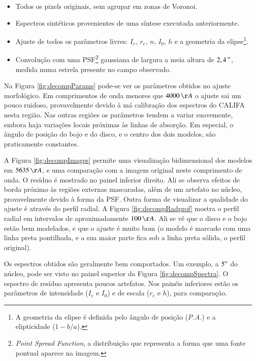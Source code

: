 \begin{itemize}

	\item Todos os pixels originais, sem agrupar em zonas de Voronoi.

	\item Espectros sintéticos provenientes de uma síntese executada anteriormente.

	\item Ajuste de todos os parâmetros livres: $I_e$, $r_e$, $n$, $I_0$, $h$ e a
	geometria da elipse\footnote{A geometria da elipse é definida pelo ângulo de
	posição ({\em P.A.}) e a elipticidade ($1 - b/a$).}.

	\item Convolução com uma PSF\footnote{{\em Point Spread Function}, a
	distribuição que representa a forma que uma fonte pontual aparece na imagem.}
	gaussiana de largura a meia altura de $2,4\,"$, medida numa estrela presente no
	campo observado.

\end{itemize}

Na Figura \ref{fig:decompParams} pode-se ver os parâmetros obtidos no ajuste
morfológico. Em comprimentos de onda menores que $4000\,\AA$ o ajuste sai um
pouco ruidoso, provavelmente devido à má calibração dos espectros do CALIFA
nesta região. Nas outras regiões os parâmetros tendem a variar suavemente,
embora haja variações locais próximas às linhas de absorção. Em especial, o
ângulo de posição do bojo e do disco, e o centro dos dois modelos, são
praticamente constantes.

A Figura \ref{fig:decompImages} permite uma visualização bidimensional dos
modelos em $5635\,\AA$, e uma comparação com a imagem original neste comprimento
de onda. O resíduo é mostrado no painel inferior direito. Ali se observa efeitos
de borda próximo às regiões externas mascaradas, além de um artefato no núcleo,
provavelmente devido à forma da PSF. Outra forma de visualizar a qualidade do
ajuste é através do perfil radial. A Figura \ref{fig:decompRadprof} mostra o
perfil radial em intervalos de aproximadamente $100\,\AA$. Ali se vê que o disco
e o bojo estão bem modelados, e que o ajuste é muito bom (o modelo é marcado com
uma linha preta pontilhada, e a sua maior parte fica sob a linha preta sólida, o
perfil original).

Os espectros obtidos são geralmente bem comportados. Um exemplo, a $5"$ do
núcleo, pode ser visto no painel superior da Figura \ref{fig:decompSpectra}.
O espectro de resíduo apresenta poucos artefatos. Nos painéis inferiores estão
os parâmetros de intensidade ($I_e$ e $I_0$) e de escala ($r_e$ e $h$), para
comparação.

